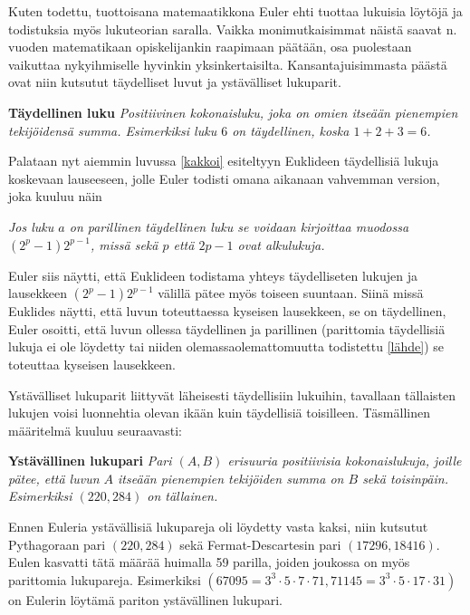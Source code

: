 \documentclass[a4paper,11pt]{article}
\begin{document}
Kuten todettu, tuottoisana matemaatikkona Euler ehti tuottaa lukuisia löytöjä ja todistuksia myös lukuteorian saralla. Vaikka monimutkaisimmat näistä saavat n. vuoden matematikaan opiskelijankin raapimaan päätään, osa puolestaan vaikuttaa nykyihmiselle hyvinkin yksinkertaisilta. Kansantajuisimmasta päästä ovat niin kutsutut täydelliset luvut ja ystävälliset lukuparit.

\begin{center}
    \textbf{Täydellinen luku} \textit{Positiivinen kokonaisluku, joka on omien itseään pienempien tekijöidensä summa. \textit{Esimerkiksi} luku $6$ on täydellinen, koska $1+2+3=6$.}
\end{center}

Palataan nyt aiemmin luvussa \ref{kakkoi} esiteltyyn Euklideen täydellisiä lukuja koskevaan lauseeseen, jolle Euler todisti omana aikanaan vahvemman version, joka kuuluu näin

\begin{center}
    \textit{Jos luku $a$ on parillinen täydellinen luku se voidaan kirjoittaa muodossa $(2^p-1)2^{p-1}$, missä sekä $p$ että $2p-1$ ovat alkulukuja.}
\end{center}

Euler siis näytti, että Euklideen todistama yhteys täydelliseten lukujen ja lausekkeen $(2^p-1)2^{p-1}$ välillä pätee myös toiseen suuntaan. Siinä missä Euklides näytti, että luvun toteuttaessa kyseisen lausekkeen, se on täydellinen, Euler osoitti, että luvun ollessa täydellinen ja parillinen (parittomia täydellisiä lukuja ei ole löydetty tai niiden olemassaolemattomuutta todistettu \ref{lähde}) se toteuttaa kyseisen lausekkeen.

Ystävälliset lukuparit liittyvät läheisesti täydellisiin lukuihin, tavallaan tällaisten lukujen voisi luonnehtia olevan ikään kuin täydellisiä toisilleen. Täsmällinen määritelmä kuuluu seuraavasti:

\begin{center}
    \textbf{Ystävällinen lukupari} \textit{Pari $(A, B)$ erisuuria positiivisia kokonaislukuja, joille pätee, että luvun $A$ itseään pienempien tekijöiden summa on $B$ sekä toisinpäin. \textit{Esimerkiksi} $(220, 284)$ on tällainen.}
\end{center}

Ennen Euleria ystävällisiä lukupareja oli löydetty vasta kaksi, niin kutsutut Pythagoraan pari $(220, 284)$ sekä Fermat-Descartesin pari $(17296, 18416)$. Eulen kasvatti tätä määrää huimalla 59 parilla, joiden joukossa on myös parittomia lukupareja. Esimerkiksi $(67095=3^3\cdot5\cdot7\cdot71, 71145=3^3\cdot5\cdot17\cdot31)$ on Eulerin löytämä pariton ystävällinen lukupari.
\end{document}

